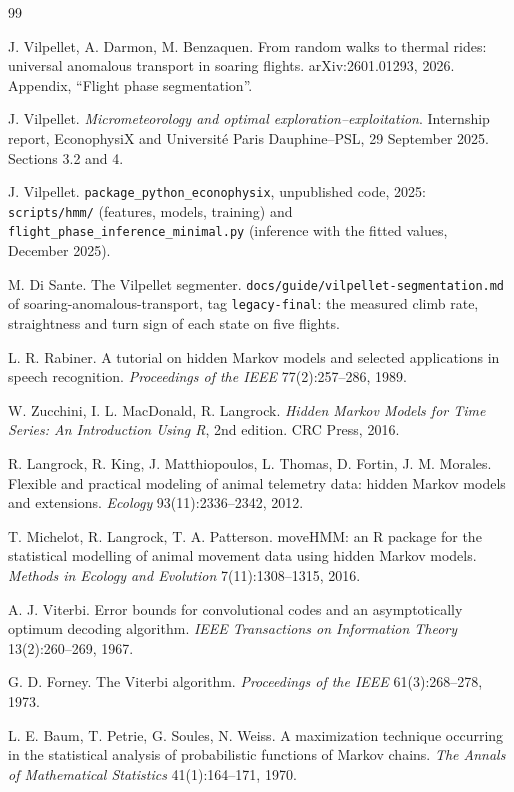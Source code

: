 \begin{thebibliography}{99}
\small

 J. Vilpellet, A. Darmon, M. Benzaquen. From random walks to thermal rides:
universal anomalous transport in soaring flights. arXiv:2601.01293, 2026. Appendix, ``Flight phase
segmentation''.

 J. Vilpellet. \emph{Micrometeorology and optimal exploration--exploitation}.
Internship report, EconophysiX and Université Paris Dauphine--PSL, 29 September 2025. Sections 3.2
and 4.

 J. Vilpellet. \texttt{package\_python\_econophysix}, unpublished code,
2025: \texttt{scripts/hmm/} (features, models, training) and
\texttt{flight\_phase\_inference\_minimal.py} (inference with the fitted values, December 2025).

 M. Di Sante. The Vilpellet segmenter. \texttt{docs/guide/vilpellet-segmentation.md}
of soaring-anomalous-transport, tag \texttt{legacy-final}: the measured climb rate, straightness and
turn sign of each state on five flights.

 L. R. Rabiner. A tutorial on hidden Markov models and selected applications in
speech recognition. \emph{Proceedings of the IEEE} 77(2):257--286, 1989.

 W. Zucchini, I. L. MacDonald, R. Langrock. \emph{Hidden Markov Models for Time
Series: An Introduction Using R}, 2nd edition. CRC Press, 2016.

 R. Langrock, R. King, J. Matthiopoulos, L. Thomas, D. Fortin, J. M. Morales.
Flexible and practical modeling of animal telemetry data: hidden Markov models and extensions.
\emph{Ecology} 93(11):2336--2342, 2012.

 T. Michelot, R. Langrock, T. A. Patterson. moveHMM: an R package for the
statistical modelling of animal movement data using hidden Markov models. \emph{Methods in Ecology
and Evolution} 7(11):1308--1315, 2016.

 A. J. Viterbi. Error bounds for convolutional codes and an asymptotically
optimum decoding algorithm. \emph{IEEE Transactions on Information Theory} 13(2):260--269, 1967.

 G. D. Forney. The Viterbi algorithm. \emph{Proceedings of the IEEE}
61(3):268--278, 1973.

 L. E. Baum, T. Petrie, G. Soules, N. Weiss. A maximization technique occurring in
the statistical analysis of probabilistic functions of Markov chains. \emph{The Annals of
Mathematical Statistics} 41(1):164--171, 1970.


\end{thebibliography}
